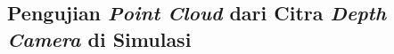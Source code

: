 \subsection{Pengujian \emph{Point Cloud} dari Citra \emph{Depth Camera} di Simulasi}
\label{subsec:pointcloudsimulasi}

\textcolor{red}{\lipsum[1-2]}
